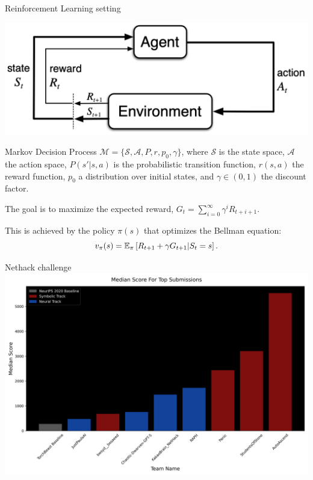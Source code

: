 \begin{frame}{Reinforcement Learning setting}
    \begin{center}
    \includegraphics[width=.6\textwidth]{images/rl.png}
    \end{center}
    
    Markov Decision Process $\mathcal{M} = \{\mathcal{S}, \mathcal{A}, P, r, p_0, \gamma\}$, where $\mathcal{S}$ is the state space, $\mathcal{A}$ the action space, $P(s'|s,a)$ is the probabilistic transition function, $r(s,a)$ the reward function, $p_0$ a distribution over initial states, and $\gamma \in (0,1)$ the discount factor.
    
    The goal is to maximize the expected reward, $G_t = \sum_{i=0}^\infty \gamma^i R_{t+i+1}$. 
    
    This is achieved by the policy $\pi(s)$ that optimizes the Bellman equation:
    \begin{equation*}
        v_\pi(s) = \operatorname{\mathbb{E}}_\pi\left[R_{t+1} + \gamma G_{t+1} | S_t=s\right].
    \end{equation*}
\end{frame}

\note[itemize]{
    \item 
}

\begin{frame}{Nethack challenge}
    \includegraphics[width=.78\textwidth]{images/FinalScore3.png}
\end{frame}

